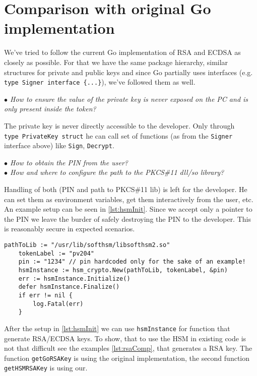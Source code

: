 \documentclass[a4paper]{scrartcl}
\begin{document}
\section{Comparison with original Go implementation}
We've tried to follow the current Go implementation of RSA and ECDSA as closely as possible. For that we have the same package hierarchy, similar structures for private and public keys and since Go partially uses interfaces (e.g. \lstinline[columns=fixed]|type Signer interface {...}|), we've followed them as well.

\textit{$\bullet$ How to ensure the value of the private key is never exposed on the PC and is only present inside the token?}

The private key is never directly accessible to the developer. Only through\\ \lstinline[columns=fixed]{type PrivateKey struct} he can call set of functions (as from the \lstinline[columns=fixed]{Signer} interface above) like \lstinline[columns=fixed]{Sign}, \lstinline[columns=fixed]{Decrypt}.

\textit{$\bullet$ How to obtain the PIN from the user?}\\
\indent\textit{$\bullet$ How and where to configure the path to the PKCS\#11 dll/so library?}

Handling of both (PIN and path to PKCS\#11 lib) is left for the developer. He can set them as environment variables, get them interactively from the user, etc. An example setup can be seen in \ref{lst:hsmInit}. Since we accept only a pointer to the PIN we leave the burder of safely destroying the PIN to the developer. This is reasonably secure in expected scenarios.

\begin{lstlisting}[caption=Initialization of the HSM, captionpos=b, label={lst:hsmInit}]
    pathToLib := "/usr/lib/softhsm/libsofthsm2.so"
    tokenLabel := "pv204"
    pin := "1234" // pin hardcoded only for the sake of an example!
    hsmInstance := hsm_crypto.New(pathToLib, tokenLabel, &pin)
    err := hsmInstance.Initialize()
    defer hsmInstance.Finalize()
    if err != nil {
        log.Fatal(err)
    }
\end{lstlisting}

After the setup in \ref{lst:hsmInit} we can use \lstinline[columns=fixed]{hsmInstance} for function that generate RSA/ECDSA keys. To show, that to use the HSM in existing code is not that difficult see the examples \ref{lst:rsaComp}, that generates a RSA key. The function \lstinline[columns=fixed]{getGoRSAKey} is using the original implementation, the second function \lstinline[columns=fixed]{getHSMRSAKey} is using our.
\end{document}
